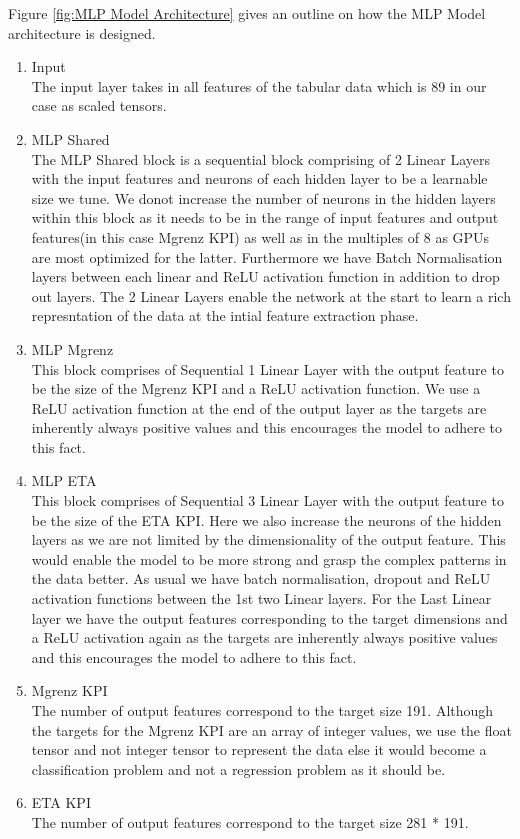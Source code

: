 \documentclass{report} %
\begin{document}
Figure \ref{fig:MLP Model Architecture} gives an outline on how the \ac{MLP} Model architecture is designed.
\begin{enumerate}
    \item Input \\
    The input layer takes in all features of the tabular data which is 89 in our case as scaled tensors.
    \item MLP Shared \\
    The MLP Shared block is a sequential block comprising of 2 Linear Layers with the input features and neurons of each hidden layer to be a learnable size we tune.
    We donot increase the number of neurons in the hidden layers within this block as it needs to be in the range of input features and output features(in this case Mgrenz \ac{KPI}) as well as in the multiples of 8 as GPUs are most optimized for the latter.
    Furthermore we have Batch Normalisation layers between each linear and \ac{ReLU} activation function in addition to drop out layers.
    The 2 Linear Layers enable the network at the start to learn a rich represntation of the data at the intial feature extraction phase.
    \item MLP Mgrenz \\
    This block comprises of Sequential 1 Linear Layer with the output feature to be the size of the Mgrenz \ac{KPI} and a \ac{ReLU} activation function.
    We use a \ac{ReLU} activation function at the end of the output layer as the targets are inherently always positive values and this encourages the model to adhere to this fact.
    \item MLP ETA \\
    This block comprises of Sequential 3 Linear Layer with the output feature to be the size of the ETA \ac{KPI}.
    Here we also increase the neurons of the hidden layers as we are not limited by the dimensionality of the output feature.
    This would enable the model to be more strong and grasp the complex patterns in the data better.
    As usual we have batch normalisation, dropout and \ac{ReLU} activation functions between the 1st two Linear layers.
    For the Last Linear layer we have the output features corresponding to the target dimensions and a \ac{ReLU} activation again as the targets are inherently always positive values and this encourages the model to adhere to this fact.
    \item Mgrenz \ac{KPI} \\
    The number of output features correspond to the target size 191.
    Although the targets for the Mgrenz \ac{KPI} are an array of integer values, we use the float tensor and not integer tensor to represent the data else it would become a classification problem and not a regression problem as it should be. \\
    \item ETA \ac{KPI} \\
    The number of output features correspond to the target size 281 * 191.
\end{enumerate}
\end{document}
